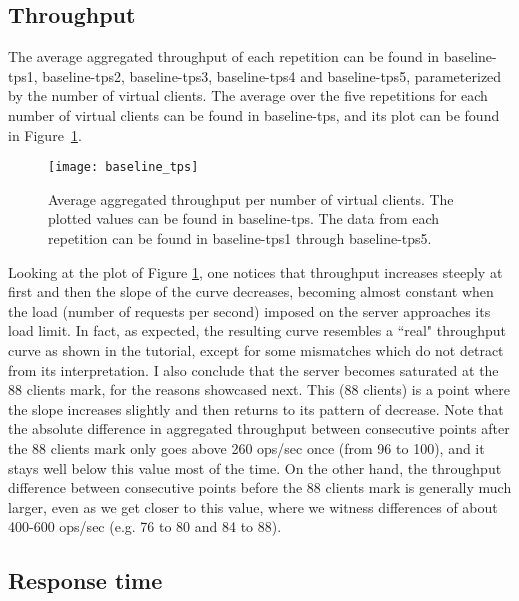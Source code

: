 \documentclass[11pt]{article}
\begin{document}
\subsection{Throughput}\label{sec:baseline:tput}

The average aggregated throughput of each repetition can be found in baseline-tps1, baseline-tps2, baseline-tps3, baseline-tps4 and baseline-tps5, parameterized by the number of virtual clients. The average over the five repetitions for each number of virtual clients can be found in baseline-tps, and its plot can be found in Figure~\ref{baseline:tps}.

\begin{figure}[H]
	\centering
	\texttt{[image: baseline\_tps]}
	\caption{Average aggregated throughput per number of virtual clients. The plotted values can be found in baseline-tps. The data from each repetition can be found in baseline-tps1 through baseline-tps5.}
	\label{baseline:tps}
\end{figure}

Looking at the plot of Figure \ref{baseline:tps}, one notices that throughput increases steeply at first and then the slope of the curve decreases, becoming almost constant when the load (number of requests per second) imposed on the server approaches its load limit. In fact, as expected, the resulting curve resembles a ``real" throughput curve as shown in the tutorial, except for some mismatches which do not detract from its interpretation. I also conclude that the server becomes saturated at the 88 clients mark, for the reasons showcased next. This (88 clients) is a point where the slope increases slightly and then returns to its pattern of decrease. Note that the absolute difference in aggregated throughput between consecutive points after the 88 clients mark only goes above 260 ops/sec once (from 96 to 100), and it stays well below this value most of the time. On the other hand, the throughput difference between consecutive points before the 88 clients mark is generally much larger, even as we get closer to this value, where we witness differences of about 400-600 ops/sec (e.g. 76 to 80 and 84 to 88).


\subsection{Response time}\label{sec:baseline:rt}
\end{document}
